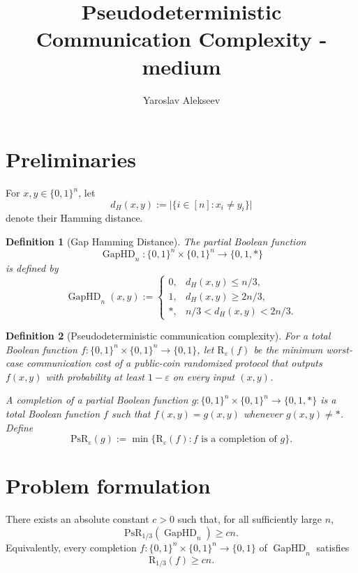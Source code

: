 \documentclass[10pt]{article}
\title{Pseudodeterministic Communication Complexity - medium}
\author{Yaroslav Alekseev}
\date{}
\newtheorem{definition}{Definition}
\begin{document}
\maketitle

\section{Preliminaries}

For $x,y\in\{0,1\}^n$, let
\[
d_H(x,y):=\bigl|\{i\in[n]:x_i\neq y_i\}\bigr|
\]
denote their Hamming distance.

\begin{definition}[Gap Hamming Distance]
The partial Boolean function
\[
\operatorname{GapHD}_n:\{0,1\}^n\times\{0,1\}^n
    \longrightarrow \{0,1,*\}
\]
is defined by
\[
\operatorname{GapHD}_n(x,y):=
\begin{cases}
0, & d_H(x,y)\le n/3,\\
1, & d_H(x,y)\ge 2n/3,\\
*, & n/3<d_H(x,y)<2n/3.
\end{cases}
\]
\end{definition}

\begin{definition}[Pseudodeterministic communication complexity]
For a total Boolean function
$f:\{0,1\}^n\times\{0,1\}^n\to\{0,1\}$, let
$\mathrm{R}_\varepsilon(f)$ be the minimum worst-case communication cost
of a public-coin randomized protocol that outputs $f(x,y)$ with
probability at least $1-\varepsilon$ on every input $(x,y)$.

A \emph{completion} of a partial Boolean function
$g:\{0,1\}^n\times\{0,1\}^n\to\{0,1,*\}$ is a total Boolean function
$f$ such that $f(x,y)=g(x,y)$ whenever $g(x,y)\neq *$. Define
\[
\mathrm{PsR}_\varepsilon(g)
:=
\min\bigl\{\mathrm{R}_\varepsilon(f):
             f\text{ is a completion of }g\bigr\}.
\]
\end{definition}

\section{Problem formulation}

There exists an absolute constant $c>0$ such that, for all sufficiently
large $n$,
\[
\mathrm{PsR}_{1/3}(\operatorname{GapHD}_n)\ge cn.
\]
Equivalently, every completion
$f:\{0,1\}^n\times\{0,1\}^n\to\{0,1\}$ of
$\operatorname{GapHD}_n$ satisfies
\[
\mathrm{R}_{1/3}(f)\ge cn.
\]
\end{document}
